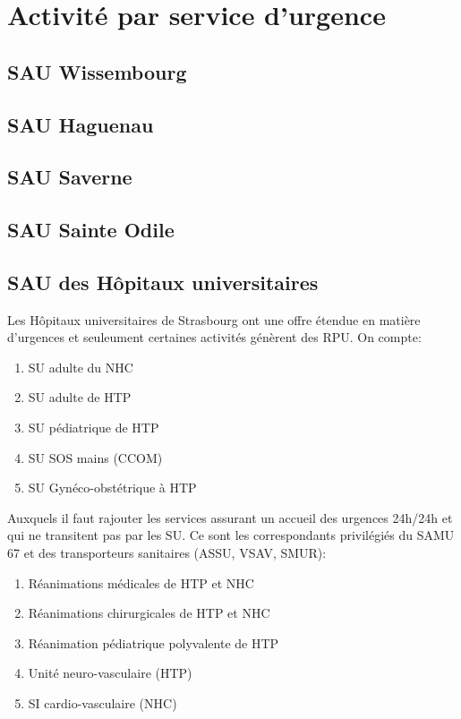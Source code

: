 \documentclass[12pt,english,french,twoside]{report}\usepackage[]{graphicx}\usepackage[]{color}
\begin{document}


\part{Activité par service d'urgence}

\newpage

\chapter{SAU Wissembourg}
\chapter{SAU Haguenau}
\chapter{SAU Saverne}
\chapter{SAU Sainte Odile}
\chapter{SAU des Hôpitaux universitaires}

Les Hôpitaux universitaires de Strasbourg ont une offre étendue en matière d'urgences et seuleument certaines activités génèrent des RPU.
On compte:
\begin{enumerate}
  \item SU adulte du NHC
  \item SU adulte de HTP
  \item SU pédiatrique de HTP
  \item SU SOS mains (CCOM)
  \item SU Gynéco-obstétrique à HTP
\end{enumerate}
Auxquels il faut rajouter les services assurant un accueil des urgences 24h/24h et qui ne transitent pas par les SU. Ce sont les correspondants privilégiés du SAMU 67 et des transporteurs sanitaires (ASSU, VSAV, SMUR):
\begin{enumerate}
  \item Réanimations médicales de HTP et NHC
  \item Réanimations chirurgicales de HTP et NHC
  \item Réanimation pédiatrique polyvalente de HTP
  \item Unité neuro-vasculaire (HTP)
  \item SI cardio-vasculaire (NHC)
\end{enumerate}
\end{document}
